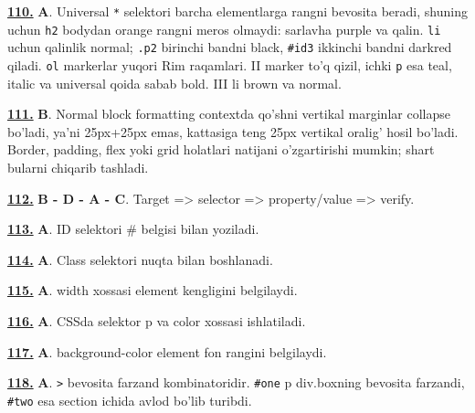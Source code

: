 \documentclass[10pt,a4paper,oneside]{article}
\begin{document}
\par\vspace{3mm}
\noindent\hyperlink{q110}{\textbf{110.}} \textbf{A}.  Universal \texttt{*} selektori barcha elementlarga rangni bevosita beradi, shuning uchun \texttt{h2} bodydan orange rangni meros olmaydi: sarlavha purple va qalin. \texttt{li} uchun qalinlik normal; \texttt{.p2} birinchi bandni black, \texttt{\#id3} ikkinchi bandni darkred qiladi. \texttt{ol} markerlar yuqori Rim raqamlari. II marker to'q qizil, ichki \texttt{p} esa teal, italic va universal qoida sabab bold. III li brown va normal.
\par\vspace{3mm}
\noindent\hyperlink{q111}{\textbf{111.}} \textbf{B}.  Normal block formatting contextda qo'shni vertikal marginlar collapse bo'ladi, ya'ni 25px+25px emas, kattasiga teng 25px vertikal oralig' hosil bo'ladi. Border, padding, flex yoki grid holatlari natijani o'zgartirishi mumkin; shart bularni chiqarib tashladi.
\par\vspace{3mm}
\noindent\hyperlink{q112}{\textbf{112.}} \textbf{B - D - A - C}.  Target =\textgreater{} selector =\textgreater{} property/value =\textgreater{} verify.
\par\vspace{3mm}
\noindent\hyperlink{q113}{\textbf{113.}} \textbf{A}.  ID selektori \# belgisi bilan yoziladi.
\par\vspace{3mm}
\noindent\hyperlink{q114}{\textbf{114.}} \textbf{A}.  Class selektori nuqta bilan boshlanadi.
\par\vspace{3mm}
\noindent\hyperlink{q115}{\textbf{115.}} \textbf{A}.  width xossasi element kengligini belgilaydi.
\par\vspace{3mm}
\noindent\hyperlink{q116}{\textbf{116.}} \textbf{A}.  CSSda selektor p va color xossasi ishlatiladi.
\par\vspace{3mm}
\noindent\hyperlink{q117}{\textbf{117.}} \textbf{A}.  background-color element fon rangini belgilaydi.
\par\vspace{3mm}
\noindent\hyperlink{q118}{\textbf{118.}} \textbf{A}.  \texttt{\textgreater{}} bevosita farzand kombinatoridir. \texttt{\#one} p div.boxning bevosita farzandi, \texttt{\#two} esa section ichida avlod bo'lib turibdi.
\end{document}
